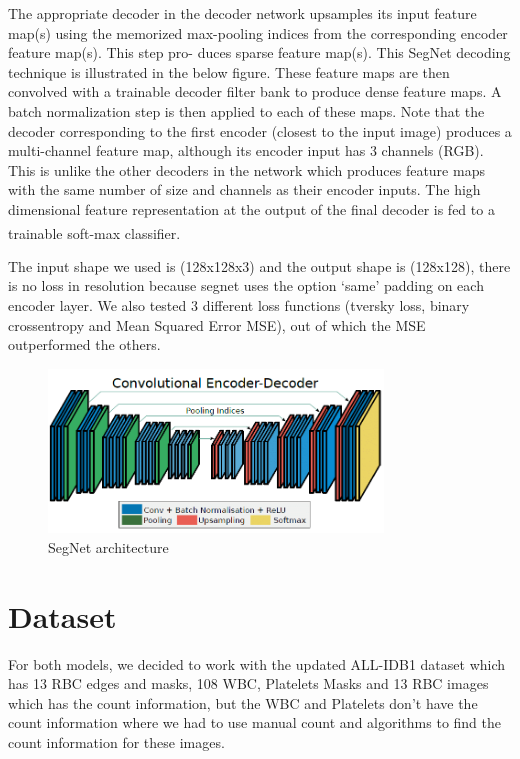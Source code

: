 The appropriate decoder in the decoder network upsamples its input feature map(s) using the memorized max-pooling indices from the corresponding encoder feature map(s). This step pro- duces sparse feature map(s). This SegNet decoding technique is illustrated in the below figure.
These feature maps are then convolved with a trainable decoder filter bank to produce dense feature maps. A batch normalization step is then applied to each of these maps. Note that the decoder corresponding to the first encoder (closest to the input image) produces a multi-channel feature map, although its encoder input has 3 channels (RGB).
This is unlike the other decoders in the network which produces feature maps with the same number of size and channels as their encoder inputs. The high dimensional feature representation at the output of the final decoder is fed to a trainable soft-max classifier. \textsuperscript{\cite{badrinarayanan2017segnet}}\

The input shape we used is (128x128x3) and the output shape is (128x128), there is no loss in resolution because segnet uses the option `same' padding on each encoder layer.
We also tested 3 different loss functions (tversky loss, binary crossentropy and Mean Squared Error MSE), out of which the MSE outperformed the others.

\vspace{0.2in}

\begin{figure}[H]
\centering
  \vspace{-0.1in}
    \centerline{\includegraphics[width = 3.5in]{../images/segnet.png}}
    \caption{SegNet architecture}
\end{figure}

\section{Dataset}
\hspace{\parindent}
For both models, we decided to work with the updated ALL-IDB1 dataset which has 13 RBC edges and masks, 108 WBC, Platelets Masks and 13 RBC images which has the count information, but the WBC and Platelets don't have the count information where we had to use manual count and algorithms to find the count information for these images.\\

